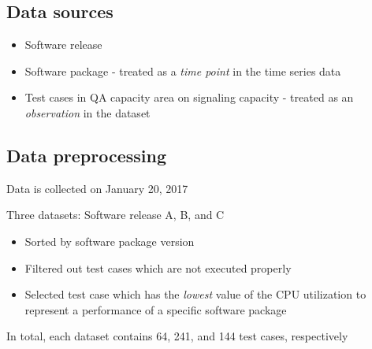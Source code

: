 \documentclass{beamer}
\begin{document}
\subsection{Data sources}
\begin{frame}[fragile]

\begin{itemize}
\item Software release
\item Software package - treated as a \textit{time point} in the time series data
\item Test cases \footnotesize{in QA capacity area on signaling capacity} \normalsize{- treated as an \textit{observation} in the dataset}


\end{itemize}

\end{frame}


\subsection{Data preprocessing}
\begin{frame}
Data is collected on January 20, 2017

Three datasets: Software release A, B, and C
\begin{itemize}
\item Sorted by software package version
\item Filtered out test cases which are not executed properly
\item Selected test case which has the \textit{lowest} value of the CPU utilization to represent a performance of a specific software package
\end{itemize}

In total, each dataset contains 64, 241, and 144 test cases, respectively

\end{frame}
\end{document}
